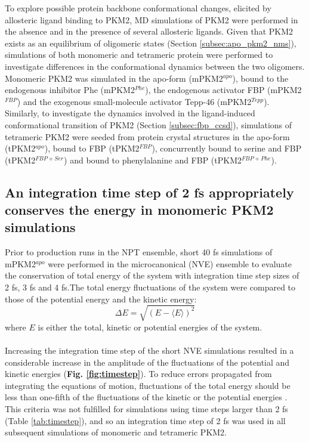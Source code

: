 To explore possible protein backbone conformational changes, elicited by allosteric ligand binding to PKM2, MD simulations of PKM2 were performed in the absence and in the presence of several allosteric ligands. Given that PKM2 exists as an equilibrium of oligomeric states (Section \ref{subsec:apo_pkm2_nms}), simulations of both monomeric and tetrameric protein were performed to investigate differences in the conformational dynamics between the two oligomers. Monomeric PKM2 was simulated in the apo-form (mPKM2$^{apo}$), bound to the endogenous inhibitor Phe (mPKM2$^{Phe}$), the endogenous activator FBP (mPKM2$^{FBP}$) and the exogenous small-molecule activator Tepp-46 (mPKM2$^{Tepp}$). Similarly, to investigate the dynamics involved in the ligand-induced conformational transition of PKM2 (Section \ref{subsec:fbp_ccsd}), simulations of tetrameric PKM2 were seeded from protein crystal structures in the apo-form (tPKM2$^{apo}$), bound to FBP (tPKM2$^{FBP}$), concurrently bound to serine and FBP (tPKM2$^{FBP+Ser}$) and bound to phenylalanine and FBP (tPKM2$^{FBP+Phe}$).


\subsection{An integration time step of 2 fs appropriately conserves the energy in monomeric PKM2 simulations}
Prior to production runs in the NPT ensemble, short 40 fs simulations of mPKM2$^{apo}$ were performed in the microcanonical (NVE) ensemble to evaluate the conservation of total energy of the system with integration time step sizes of 2 fs, 3 fs and 4 fs.The total energy fluctuations of the system were compared to those of the potential energy and the kinetic energy:
%
%
\begin{equation}
\Delta E = \sqrt{( E - \langle E \rangle )^2 }
\label{equ:energy_fluc}
\end{equation}
%
%
where $E$ is either the total, kinetic or potential energies of the system.
%
%
\\\\
%
%
Increasing the integration time step of the short NVE simulations resulted in a considerable increase in the amplitude of the fluctuations of the potential and kinetic energies (\textbf{Fig. \ref{fig:timestep}}). To reduce errors propagated from integrating the equations of motion, fluctuations of the total energy should be less than one-fifth of the fluctuations of the kinetic or the potential energies \cite{Winger:2009aa}. This criteria was not fulfilled for simulations using time steps larger than 2 fs (Table \ref{tab:timestep}), and so an integration time step of 2 fs was used in all subsequent simulations of monomeric and tetrameric PKM2.

